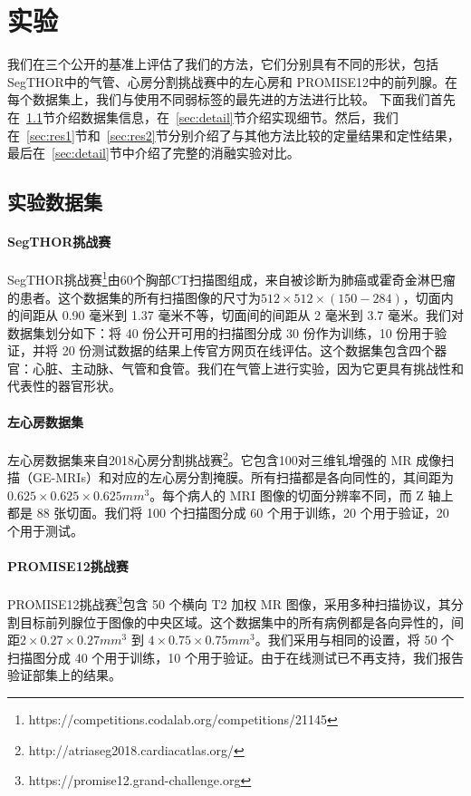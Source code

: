 \section{实验}
我们在三个公开的基准上评估了我们的方法，它们分别具有不同的形状，包括 SegTHOR\citep{trullo2019multiorgan}中的气管、心房分割挑战赛中的左心房和 PROMISE12\citep{Litjens2014EvaluationOP}中的前列腺。在每个数据集上，我们与使用不同弱标签的最先进的方法进行比较。
下面我们首先在~\ref{sec:dataset}节介绍数据集信息，在~\ref{sec:detail}节介绍实现细节。然后，我们在~\ref{sec:res1}节和~\ref{sec:res2}节分别介绍了与其他方法比较的定量结果和定性结果，最后在~\ref{sec:detail}节中介绍了完整的消融实验对比。

\subsection{实验数据集} \label{sec:dataset}

\paragraph{SegTHOR挑战赛}
SegTHOR挑战赛\footnote{https://competitions.codalab.org/competitions/21145}\citep{trullo2019multiorgan}由60个胸部CT扫描图组成，来自被诊断为肺癌或霍奇金淋巴瘤的患者。这个数据集的所有扫描图像的尺寸为$512\times512\times(150-284)$，切面内的间距从 0.90 毫米到 1.37 毫米不等，切面间的间距从 2 毫米到 3.7 毫米。我们对数据集划分如下：将 40 份公开可用的扫描图分成 30 份作为训练，10 份用于验证，并将 20 份测试数据的结果上传官方网页在线评估。这个数据集包含四个器官：心脏、主动脉、气管和食管。我们在气管上进行实验，因为它更具有挑战性和代表性的器官形状。

\paragraph{左心房数据集}
左心房数据集来自2018心房分割挑战赛\footnote{http://atriaseg2018.cardiacatlas.org/}。它包含100对三维钆增强的 MR 成像扫描（GE-MRIs）和对应的左心房分割掩膜。所有扫描都是各向同性的，其间距为 $0.625\times0.625\times0.625 mm^{3}$。每个病人的 MRI 图像的切面分辨率不同，而 Z 轴上都是 88 张切面。我们将 100 个扫描图分成 60 个用于训练，20 个用于验证，20 个用于测试。

\paragraph{PROMISE12挑战赛}
PROMISE12挑战赛\footnote{https://promise12.grand-challenge.org}\citep{Litjens2014EvaluationOP}包含 50 个横向 T2 加权 MR 图像，采用多种扫描协议，其分割目标前列腺位于图像的中央区域。这个数据集中的所有病例都是各向异性的，间距$2\times0.27\times0.27 mm^{3}$ 到 $4\times0.75\times0.75 mm^{3}$。我们采用与\citet{kervadec2020bounding}相同的设置，将 50 个扫描图分成 40 个用于训练，10 个用于验证。由于在线测试已不再支持，我们报告验证部集上的结果。

